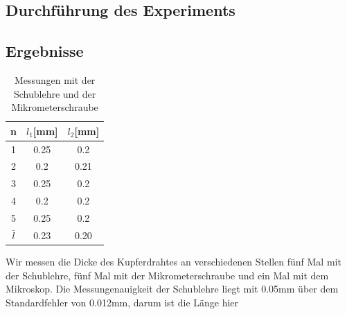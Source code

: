 \documentclass{article}
\begin{document}
\subsection{Durchführung des Experiments}

\subsection{Ergebnisse}

\begin{table}
\centering
\begin{tabular}{|c|c|c|}
\hline
n&$l_1$[mm]&$l_2$[mm]\\
\hline
\hline
1&0.25&0.2\\
2&0.2&0.21\\
3&0.25&0.2\\
4&0.2&0.2\\
5&0.25&0.2\\
\hline 
$\bar{l}$&0.23&0.20\\
\hline
\end{tabular}
\caption{Messungen mit der Schublehre und der Mikrometerschraube}
\end{table}

Wir messen die Dicke des Kupferdrahtes an verschiedenen Stellen  fünf Mal mit der Schublehre, fünf Mal mit der Mikrometerschraube und ein Mal mit dem Mikroskop.  Die Messungenauigkeit der Schublehre liegt mit 0.05mm über dem Standardfehler von 0.012mm, darum ist die Länge hier
\end{document}
